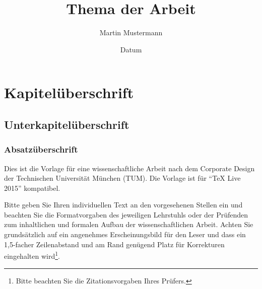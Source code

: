 %
% 
% 
%


\renewcommand{\Thema}{%
    Thema der Arbeit (optional)}




\title{Thema der Arbeit}
\author{Martin Mustermann}
\date{Datum}

\tableofcontents %

\chapter{Kapitelüberschrift}

\section{Unterkapitelüberschrift}

\subsection[]{Absatzüberschrift}

Dies ist die Vorlage für eine wissenschaftliche Arbeit nach dem Corporate
Design der Technischen Universität München (TUM). Die Vorlage ist für "`TeX
Live 2015"' kompatibel.

Bitte geben Sie Ihren individuellen Text an den vorgesehenen Stellen ein und
beachten Sie die Formatvorgaben des jeweiligen Lehrstuhls oder der Prüfenden
zum inhaltlichen und formalen Aufbau der wissenschaftlichen Arbeit. Achten Sie
grundsätzlich auf ein angenehmes Erscheinungsbild für den Leser und dass ein
1,5-facher Zeilenabstand und am Rand genügend Platz für Korrekturen
eingehalten wird\footnote{Bitte beachten Sie die Zitationsvorgaben Ihres
Prüfers.}.

